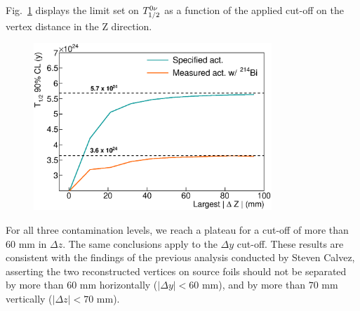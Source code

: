 Fig.~\ref{fig:cont_vertex} displays the limit set on $T_{1/2}^{0\nu}$ as a function of the applied cut-off on the vertex distance in the Z direction.
\begin{figure}[h]
  \centering
  \includegraphics[width=0.8\textwidth]{Sensitivity/fig_sensitivity/contamination_vertex.eps}
  \caption{
    \label{fig:cont_vertex}}
\end{figure}
For all three contamination levels, we reach a plateau for a cut-off of more than 60 mm in $\Delta z$.
The same conclusions apply to the $\Delta y$ cut-off.
These results are consistent with the findings of the previous analysis conducted by Steven Calvez, asserting the two reconstructed vertices on source foils should not be separated by more than $60$ mm horizontally ($|\Delta y| < 60$ mm), and by more than $70$ mm vertically ($|\Delta z| < 70$ mm).


